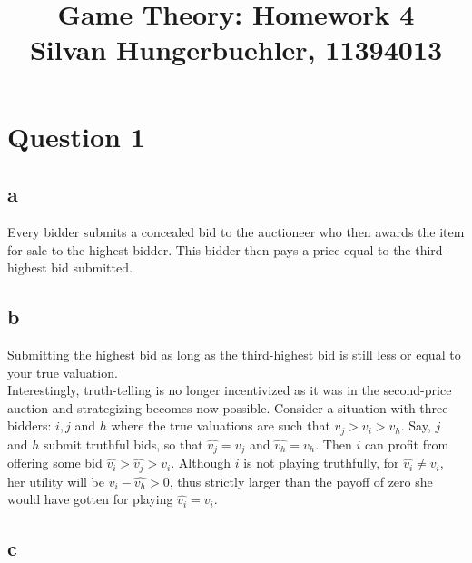 \documentclass[10pt,a4paper]{article}
\title{%
  Game Theory: Homework 4 \\
  \large Silvan Hungerbuehler, 11394013}
\date{}
\begin{document}
\maketitle

\section*{Question 1}
\subsection*{a}
Every bidder submits a concealed bid to the auctioneer who then awards the item for sale to the highest bidder. This bidder then pays a price equal to the third-highest bid submitted.
\subsection*{b}
Submitting the highest bid as long as the third-highest bid is still less or equal to your true valuation. \\
Interestingly, truth-telling is no longer incentivized as it was in the second-price auction and strategizing becomes now possible. Consider a situation with three bidders: $i,j$ and $h$ where the true valuations are such that $v_j>v_i>v_h$. Say, $j$ and $h$ submit truthful bids, so that $\hat{v_j}=v_j$ and $\hat{v_h}=v_h$. Then $i$ can profit from offering some bid $\hat{v_i}>\hat{v_j}>v_i$. Although $i$ is not playing truthfully, for $\hat{v_i}\neq v_i$, her utility will be $v_i-\hat{v_h}>0$, thus strictly larger than the payoff of zero she would have gotten for playing $\hat{v_i}=v_i$.
\subsection*{c}
\end{document}
